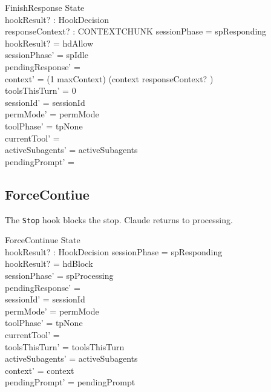 \documentclass[a4paper,10pt,fleqn]{article}
\begin{document}
\begin{schema}{FinishResponse}
  \Delta State \\
  hookResult? : HookDecision \\
  responseContext? : CONTEXTCHUNK
  \where
  sessionPhase = spResponding \\
  hookResult? = hdAllow \\
  sessionPhase' = spIdle \\
  pendingResponse' = \emptyset \\
  context' = (1 \upto maxContext) \dres (context \cat \langle responseContext? \rangle) \\
  toolsThisTurn' = 0 \\
  sessionId' = sessionId \\
  permMode' = permMode \\
  toolPhase' = tpNone \\
  currentTool' = \emptyset \\
  activeSubagents' = activeSubagents \\
  pendingPrompt' = \emptyset
\end{schema}

\subsection{ForceContiue}

The \texttt{Stop} hook blocks the stop. Claude returns to processing.

\begin{schema}{ForceContinue}
  \Delta State \\
  hookResult? : HookDecision
  \where
  sessionPhase = spResponding \\
  hookResult? = hdBlock \\
  sessionPhase' = spProcessing \\
  pendingResponse' = \emptyset \\
  sessionId' = sessionId \\
  permMode' = permMode \\
  toolPhase' = tpNone \\
  currentTool' = \emptyset \\
  toolsThisTurn' = toolsThisTurn \\
  activeSubagents' = activeSubagents \\
  context' = context \\
  pendingPrompt' = pendingPrompt
\end{schema}
\end{document}
